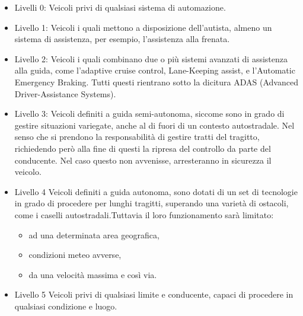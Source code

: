 \documentclass[14pt]{extarticle}
\begin{document}
\begin{itemize}
\item Livelli 0:
Veicoli privi di qualsiasi sistema di automazione.
\item Livello 1: 
Veicoli  i quali mettono a disposizione dell'autista, almeno un sistema di assistenza, per esempio, l'assistenza alla frenata.
\item Livello 2:
Veicoli i quali combinano due o più sistemi avanzati di assistenza alla guida, come l'adaptive cruise control, Lane-Keeping assist, e l'Automatic Emergency Braking. Tutti questi rientrano sotto la dicitura ADAS (Advanced Driver-Assistance Systems). 
\item Livello 3:
Veicoli definiti a guida semi-autonoma, siccome sono in grado di  gestire situazioni variegate, anche al di fuori di un contesto autostradale. Nel senso che si prendono la responsabilità di gestire tratti del tragitto, richiedendo però alla fine di questi la ripresa del controllo da parte del conducente. Nel caso questo non avvenisse, arresteranno in sicurezza il  veicolo.
\item Livello 4
Veicoli definiti a guida autonoma, sono dotati di un set di tecnologie in grado di procedere per lunghi tragitti, superando una varietà di ostacoli, come i caselli autostradali.Tuttavia il loro funzionamento sarà limitato:
\begin{itemize}
\item ad una determinata area geografica,
\item condizioni meteo avverse,
\item da una velocità massima e così via.
\end{itemize}

\item Livello 5
Veicoli privi di qualsiasi limite e conducente, capaci di procedere in qualsiasi condizione e luogo.
\end{itemize}

\end{document}
